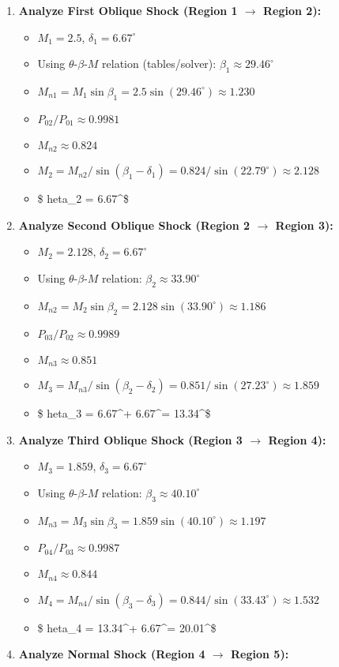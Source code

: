 \begin{enumerate}
\def\labelenumi{\arabic{enumi}.}
\tightlist
\item
  \textbf{Analyze First Oblique Shock (Region 1 \(\to\) Region 2):}

  \begin{itemize}
  \tightlist
  \item
    \(M_1 = 2.5\), \(\delta_1 = 6.67^\circ\)
  \item
    Using \(\theta\)-\(\beta\)-\(M\) relation (tables/solver):
    \(\beta_1 \approx 29.46^\circ\)
  \item
    \(M_{n1} = M_1 \sin\beta_1 = 2.5 \sin(29.46^\circ) \approx 1.230\)
  \item
    \(P_{02}/P_{01} \approx 0.9981\)
  \item
    \(M_{n2} \approx 0.824\)
  \item
    \(M_2 = M_{n2} / \sin(\beta_1 - \delta_1) = 0.824 / \sin(22.79^\circ) \approx 2.128\)
  \item
    \$ heta\_2 = 6.67\^{}\circ\$
  \end{itemize}
\item
  \textbf{Analyze Second Oblique Shock (Region 2 \(\to\) Region 3):}

  \begin{itemize}
  \tightlist
  \item
    \(M_2 = 2.128\), \(\delta_2 = 6.67^\circ\)
  \item
    Using \(\theta\)-\(\beta\)-\(M\) relation:
    \(\beta_2 \approx 33.90^\circ\)
  \item
    \(M_{n2} = M_2 \sin\beta_2 = 2.128 \sin(33.90^\circ) \approx 1.186\)
  \item
    \(P_{03}/P_{02} \approx 0.9989\)
  \item
    \(M_{n3} \approx 0.851\)
  \item
    \(M_3 = M_{n3} / \sin(\beta_2 - \delta_2) = 0.851 / \sin(27.23^\circ) \approx 1.859\)
  \item
    \$ heta\_3 = 6.67\^{}\circ + 6.67\^{}\circ = 13.34\^{}\circ\$
  \end{itemize}
\item
  \textbf{Analyze Third Oblique Shock (Region 3 \(\to\) Region 4):}

  \begin{itemize}
  \tightlist
  \item
    \(M_3 = 1.859\), \(\delta_3 = 6.67^\circ\)
  \item
    Using \(\theta\)-\(\beta\)-\(M\) relation:
    \(\beta_3 \approx 40.10^\circ\)
  \item
    \(M_{n3} = M_3 \sin\beta_3 = 1.859 \sin(40.10^\circ) \approx 1.197\)
  \item
    \(P_{04}/P_{03} \approx 0.9987\)
  \item
    \(M_{n4} \approx 0.844\)
  \item
    \(M_4 = M_{n4} / \sin(\beta_3 - \delta_3) = 0.844 / \sin(33.43^\circ) \approx 1.532\)
  \item
    \$ heta\_4 = 13.34\^{}\circ + 6.67\^{}\circ = 20.01\^{}\circ\$
  \end{itemize}
\item
  \textbf{Analyze Normal Shock (Region 4 \(\to\) Region 5):}


\end{enumerate}
